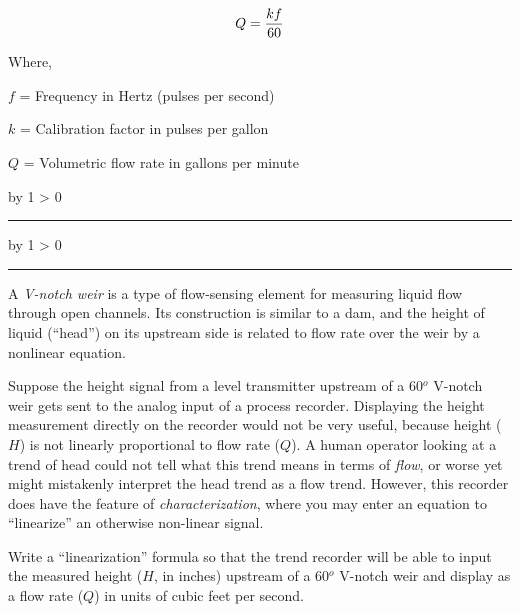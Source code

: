 \documentclass[12pt,a4paper]{article}
\def\oppgave{
            \advance\questnum by 1
            \ifnum \questnum > 0
                 \hrule
                 \vskip 3pt
                 \leftline{Oppgave \the\questnum}
                 \vskip 3pt \fi}
\def\notes{
           \advance\explnum by 1
           \ifnum \explnum > 0
                \hrule
                \vskip 3pt
                \leftline{Notes \the\explnum}
                \vskip 3pt \fi}
\begin{document}
\vskip 10pt

$$Q = {kf \over 60}$$

\noindent
Where,

$f$ = Frequency in Hertz (pulses per second)

$k$ = Calibration factor in pulses per gallon

$Q$ = Volumetric flow rate in gallons per minute


\vskip 10pt \filbreak 





\notes{} 



\vfil \eject 



\oppgave{} 

A {\it V-notch weir} is a type of flow-sensing element for measuring liquid flow through open channels.  Its construction is similar to a dam, and the height of liquid (``head'') on its upstream side is related to flow rate over the weir by a nonlinear equation.

Suppose the height signal from a level transmitter upstream of a 60$^{o}$ V-notch weir gets sent to the analog input of a process recorder.  Displaying the height measurement directly on the recorder would not be very useful, because height ($H$) is not linearly proportional to flow rate ($Q$).  A human operator looking at a trend of head could not tell what this trend means in terms of {\it flow}, or worse yet might mistakenly interpret the head trend as a flow trend.  However, this recorder does have the feature of {\it characterization}, where you may enter an equation to ``linearize'' an otherwise non-linear signal.

\vskip 10pt

Write a ``linearization'' formula so that the trend recorder will be able to input the measured height ($H$, in inches) upstream of a 60$^{o}$ V-notch weir and display as a flow rate ($Q$) in units of cubic feet per second.

\vfil 

\eject
\vskip 10pt \filbreak 
\end{document}
